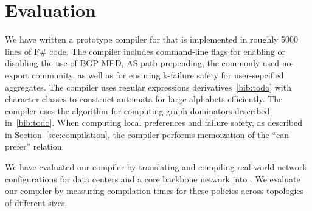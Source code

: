 \section{Evaluation}

We have written a prototype compiler for \sysname that is implemented in roughly 5000 lines of F\# code. The compiler includes command-line flags for enabling or disabling the use of BGP MED, AS path prepending, the commonly used no-export community, as well as for ensuring k-failure safety for user-sepcified aggregates. The compiler uses regular expressions derivatives~\ref{bib:todo} with character classes to construct automata for large alphabets efficiently. The compiler uses the algorithm for computing graph dominators described in~\ref{bib:todo}. When computing local preferences and failure safety, as described in Section~\ref{sec:compilation}, the compiler performs memoization of the ``can prefer'' relation. 

We have evaluated our compiler by translating and compiling real-world network configurations for data centers and a core backbone network into \sysname. We evaluate our compiler by measuring compilation times for these policies across topologies of different sizes.
